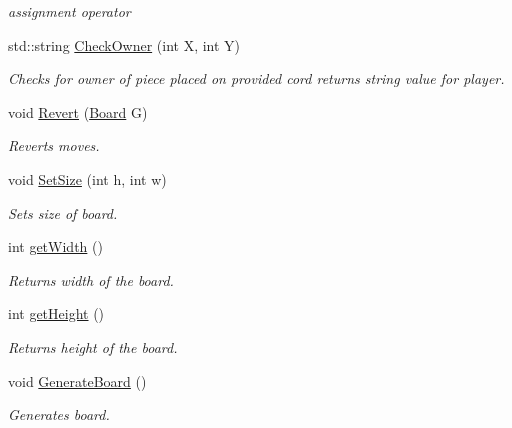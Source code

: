\begin{DoxyCompactItemize}
\begin{DoxyCompactList}\small\item\em assignment operator \end{DoxyCompactList}\item 
std\-::string \hyperlink{class_board_ab4b499dd0102694b8eb2f67f6717f9d3}{Check\-Owner} (int X, int Y)
\begin{DoxyCompactList}\small\item\em Checks for owner of piece placed on provided cord returns string value for player. \end{DoxyCompactList}\item 
void \hyperlink{class_board_a5bef79c659946f9849a3d163f27e5191}{Revert} (\hyperlink{class_board}{Board} G)
\begin{DoxyCompactList}\small\item\em Reverts moves. \end{DoxyCompactList}\item 
void \hyperlink{class_board_abbfb453ac45df0b5b1ca389c3edc3810}{Set\-Size} (int h, int w)
\begin{DoxyCompactList}\small\item\em Sets size of board. \end{DoxyCompactList}\item 
\hypertarget{class_board_a67905f3b441a8605aeb50d8978415aa0}{int \hyperlink{class_board_a67905f3b441a8605aeb50d8978415aa0}{get\-Width} ()}\label{class_board_a67905f3b441a8605aeb50d8978415aa0}

\begin{DoxyCompactList}\small\item\em Returns width of the board. \end{DoxyCompactList}\item 
\hypertarget{class_board_a14466e56568d523e5f4d0d695ccbcce1}{int \hyperlink{class_board_a14466e56568d523e5f4d0d695ccbcce1}{get\-Height} ()}\label{class_board_a14466e56568d523e5f4d0d695ccbcce1}

\begin{DoxyCompactList}\small\item\em Returns height of the board. \end{DoxyCompactList}\item 
\hypertarget{class_board_a9b90253fcbc77e78916f618c51558cc4}{void \hyperlink{class_board_a9b90253fcbc77e78916f618c51558cc4}{Generate\-Board} ()}\label{class_board_a9b90253fcbc77e78916f618c51558cc4}

\begin{DoxyCompactList}\small\item\em Generates board. \end{DoxyCompactList}\end{DoxyCompactItemize}
